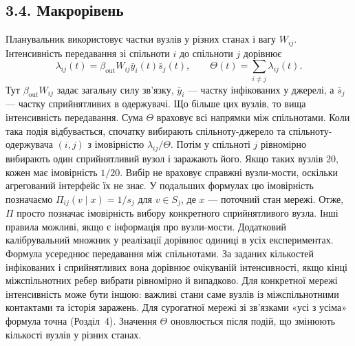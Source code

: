 ﻿\documentclass[11pt,a4paper]{article}
\newcommand{\ibar}{\bar{y}}
\newcommand{\sbar}{\bar{s}}
\begin{document}
\subsection*{3.4. Макрорівень}
Планувальник використовує частки вузлів у різних станах і вагу $W_{ij}$. Інтенсивність передавання зі спільноти $i$ до спільноти $j$ дорівнює
\begin{equation*}\lambda_{ij}(t)=\beta_{\mathrm{out}}W_{ij}\ibar_i(t)\sbar_j(t),
\qquad \Theta(t)=\sum_{i\neq j}\lambda_{ij}(t).\tag{4}
\end{equation*}
Тут $\beta_{\mathrm{out}}W_{ij}$ задає загальну силу зв'язку, $\ibar_i$ --- частку інфікованих у джерелі, а $\sbar_j$ --- частку сприйнятливих в одержувачі. Що більше цих вузлів, то вища інтенсивність передавання. Сума $\Theta$ враховує всі напрямки між спільнотами.
Коли така подія відбувається, спочатку вибирають спільноту-джерело та спільноту-одержувача $(i,j)$ з імовірністю $\lambda_{ij}/\Theta$. Потім у спільноті $j$ рівномірно вибирають один сприйнятливий вузол і заражають його. Якщо таких вузлів 20, кожен має імовірність $1/20$. Вибір не враховує справжні вузли-мости, оскільки агрегований інтерфейс їх не знає. У подальших формулах цю імовірність позначаємо $\Pi_{ij}(v\mid x)=1/s_j$ для $v\in S_j$, де $x$ --- поточний стан мережі. Отже, $\Pi$ просто позначає імовірність вибору конкретного сприйнятливого вузла. Інші правила можливі, якщо є інформація про вузли-мости. Додатковий калібрувальний множник у реалізації дорівнює одиниці в усіх експериментах.
Формула усереднює передавання між спільнотами. За заданих кількостей інфікованих і сприйнятливих вона дорівнює очікуваній інтенсивності, якщо кінці міжспільнотних ребер вибрати рівномірно й випадково. Для конкретної мережі інтенсивність може бути іншою: важливі стани саме вузлів із міжспільнотними контактами та історія заражень. Для сурогатної мережі зі зв'язками «усі з усіма» формула точна (Розділ~4). Значення $\Theta$ оновлюється після подій, що змінюють кількості вузлів у різних станах.
\end{document}
